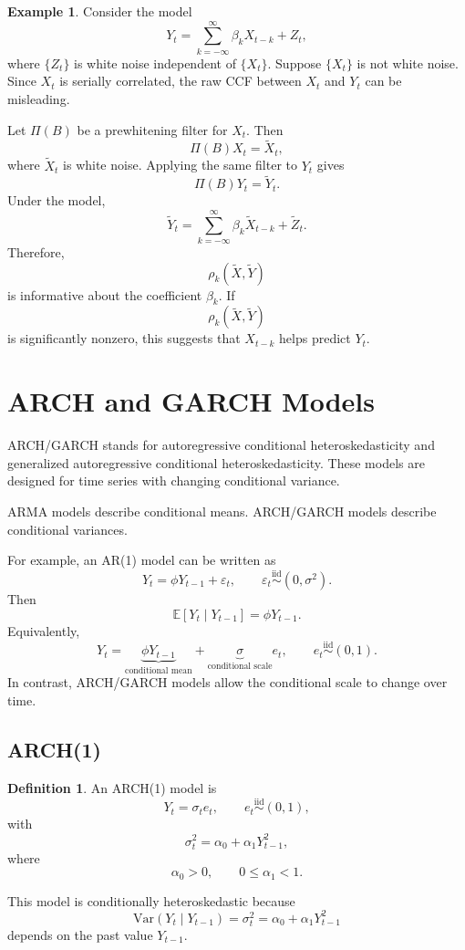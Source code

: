 \documentclass[12pt,oneside]{book}
\numberwithin{equation}{section}
\theoremstyle{definition}
\newtheorem{definition}{Definition}[section]
\newtheorem{example}{Example}[section]
\theoremstyle{plain}
\theoremstyle{remark}
\newcommand{\E}{\mathbb{E}}
\newcommand{\Var}{\mathrm{Var}}
\newcommand{\iid}{\overset{\text{iid}}{\sim}}
\begin{document}
\begin{example}
Consider the model
\[
Y_t
=
\sum_{k=-\infty}^{\infty}\beta_kX_{t-k}+Z_t,
\]
where $\{Z_t\}$ is white noise independent of $\{X_t\}$. Suppose $\{X_t\}$ is not white noise. Since $X_t$ is serially correlated, the raw CCF between $X_t$ and $Y_t$ can be misleading.

Let $\Pi(B)$ be a prewhitening filter for $X_t$. Then
\[
\Pi(B)X_t=\widetilde{X}_t,
\]
where $\widetilde{X}_t$ is white noise. Applying the same filter to $Y_t$ gives
\[
\Pi(B)Y_t=\widetilde{Y}_t.
\]
Under the model,
\[
\widetilde{Y}_t
=
\sum_{k=-\infty}^{\infty}\beta_k\widetilde{X}_{t-k}
+
\widetilde{Z}_t.
\]
Therefore,
\[
\rho_k(\widetilde{X},\widetilde{Y})
\]
is informative about the coefficient $\beta_k$. If
\[
\rho_k(\widetilde{X},\widetilde{Y})
\]
is significantly nonzero, this suggests that $X_{t-k}$ helps predict $Y_t$.
\end{example}

\section{ARCH and GARCH Models}

ARCH/GARCH stands for autoregressive conditional heteroskedasticity and generalized autoregressive conditional heteroskedasticity. These models are designed for time series with changing conditional variance.

ARMA models describe conditional means. ARCH/GARCH models describe conditional variances.

For example, an AR(1) model can be written as
\[
Y_t=\phi Y_{t-1}+\varepsilon_t,
\qquad
\varepsilon_t\iid(0,\sigma^2).
\]
Then
\[
\E[Y_t\mid Y_{t-1}]=\phi Y_{t-1}.
\]
Equivalently,
\[
Y_t
=
\underbrace{\phi Y_{t-1}}_{\text{conditional mean}}
+
\underbrace{\sigma}_{\text{conditional scale}}e_t,
\qquad
e_t\iid(0,1).
\]
In contrast, ARCH/GARCH models allow the conditional scale to change over time.

\subsection{ARCH(1)}

\begin{definition}
An ARCH(1) model is
\[
Y_t=\sigma_te_t,
\qquad
e_t\iid(0,1),
\]
with
\[
\sigma_t^2=\alpha_0+\alpha_1Y_{t-1}^2,
\]
where
\[
\alpha_0>0,
\qquad
0\leq \alpha_1<1.
\]
\end{definition}

This model is conditionally heteroskedastic because
\[
\Var(Y_t\mid Y_{t-1})=\sigma_t^2=\alpha_0+\alpha_1Y_{t-1}^2
\]
depends on the past value $Y_{t-1}$.
\end{document}
